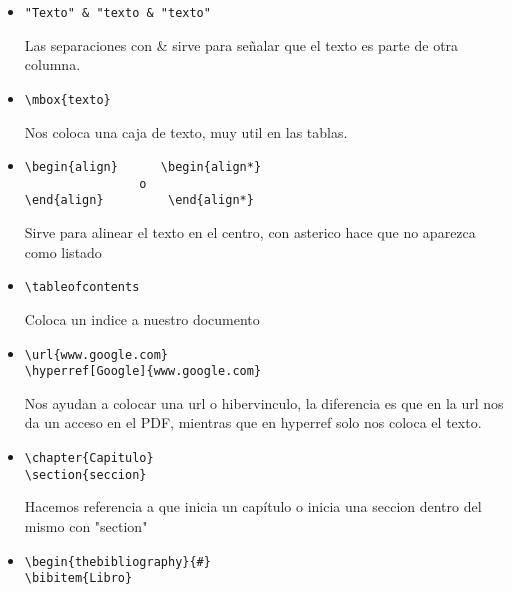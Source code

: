 \documentclass{book}
\begin{document}
\begin{enumerate}
\begin{itemize}
		\begin{lstlisting}  
\hline  o \hline "texto" \hline
		\end{lstlisting}  Dibuja lineas horizontales a nuestra tabla, si se coloca el texto entre dos de esta lineas se cierra la tabla
		\item 
		\begin{lstlisting}  
"Texto" & "texto & "texto"
		\end{lstlisting} Las separaciones con \& sirve para señalar que el texto es parte de otra columna.
		\item
		\begin{lstlisting}  
\mbox{texto}
		\end{lstlisting} Nos coloca una caja de texto, muy util en las tablas.
		\item
		\begin{lstlisting} 
\begin{align}      \begin{align*}
        		o     
\end{align}         \end{align*}
		\end{lstlisting} Sirve para alinear el texto en el centro, con asterico hace que no aparezca como listado
		\item
		\begin{lstlisting}  
\tableofcontents
		\end{lstlisting} Coloca un indice a nuestro documento
		\item
		\begin{lstlisting} 
\url{www.google.com}
\hyperref[Google]{www.google.com}			
		\end{lstlisting} Nos ayudan a colocar una url o hibervinculo, la diferencia es que en la url nos da un acceso en el PDF, mientras que en hyperref solo nos coloca el texto.
		\item
		\begin{lstlisting} 
\chapter{Capitulo}
\section{seccion}		
		\end{lstlisting} Hacemos referencia a que inicia un capítulo o  inicia una seccion dentro del mismo con "section"
		\item
		\begin{lstlisting} 
\begin{thebibliography}{#}
\bibitem{Libro}
		

\end{lstlisting}
\end{itemize}
\end{enumerate}
\end{document}
